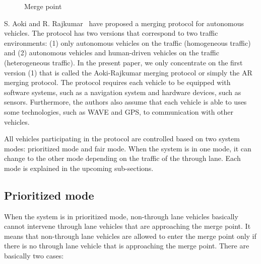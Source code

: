 \documentclass[10pt, conference, compsocconf]{IEEEtran}
\begin{document}
\begin{figure}[t]
\begin{center}
\end{center}
\caption{Merge point}
\label{mergePoint_fig}
\end{figure}

S. Aoki and R. Rajkumar~\cite{10.1145/3055004.3055028} have proposed a
merging protocol for autonomous vehicles. The protocol has two
versions that correspond to two traffic environments: (1) only
autonomous vehicles on the traffic (homogeneous traffic) and (2)
autonomous vehicles and human-driven vehicles on the traffic
(heterogeneous traffic).  In the present paper, we only concentrate on
the first version (1) that is called the Aoki-Rajkumar merging
protocol or simply the AR merging protocol.  The protocol requires
each vehicle to be equipped with software systems, such as a
navigation system and hardware devices, such as sensors.  Furthermore,
the authors also assume that each vehicle is able to uses some
technologies, such as WAVE \cite{4346439,5888501} and GPS, to
communication with other vehicles.

All vehicles participating in the protocol are controlled based on two
system modes: prioritized mode and fair mode.  When the system is in
one mode, it can change to the other mode depending on the traffic of
the through lane. Each mode is explained in the upcoming sub-sections.

\subsection{Prioritized mode}

When the system is in prioritized mode, non-through lane vehicles
basically cannot intervene through lane vehicles that are approaching
the merge point.  It means that non-through lane vehicles are allowed
to enter the merge point only if there is no through lane vehicle that
is approaching the merge point.  There are basically two cases:
\end{document}
